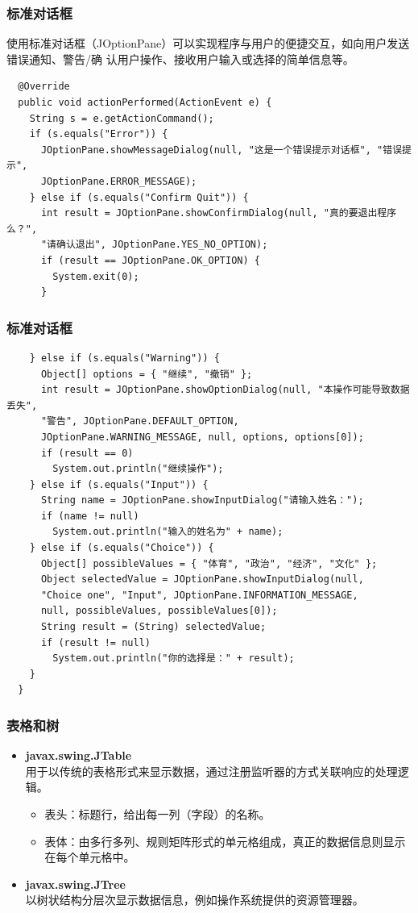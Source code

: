 \begin{frame}[fragile] %
\frametitle{标准对话框}

使用标准对话框（JOptionPane）可以实现程序与用户的便捷交互，如向用户发送错误通知、警告/确
认用户操作、接收用户输入或选择的简单信息等。

\scriptsize
\begin{verbatim}
  @Override
  public void actionPerformed(ActionEvent e) {
    String s = e.getActionCommand();
    if (s.equals("Error")) {
      JOptionPane.showMessageDialog(null, "这是一个错误提示对话框", "错误提示",
      JOptionPane.ERROR_MESSAGE);
    } else if (s.equals("Confirm Quit")) {
      int result = JOptionPane.showConfirmDialog(null, "真的要退出程序么？",
      "请确认退出", JOptionPane.YES_NO_OPTION);
      if (result == JOptionPane.OK_OPTION) {
        System.exit(0);
      }
\end{verbatim}
\end{frame}

\begin{frame}[fragile] %
\frametitle{标准对话框}

\scriptsize
\begin{verbatim}
    } else if (s.equals("Warning")) {
      Object[] options = { "继续", "撤销" };
      int result = JOptionPane.showOptionDialog(null, "本操作可能导致数据丢失",
      "警告", JOptionPane.DEFAULT_OPTION,
      JOptionPane.WARNING_MESSAGE, null, options, options[0]);
      if (result == 0)
        System.out.println("继续操作");
    } else if (s.equals("Input")) {
      String name = JOptionPane.showInputDialog("请输入姓名：");
      if (name != null) 
        System.out.println("输入的姓名为" + name);
    } else if (s.equals("Choice")) {
      Object[] possibleValues = { "体育", "政治", "经济", "文化" };
      Object selectedValue = JOptionPane.showInputDialog(null,
      "Choice one", "Input", JOptionPane.INFORMATION_MESSAGE,
      null, possibleValues, possibleValues[0]);
      String result = (String) selectedValue;
      if (result != null) 
        System.out.println("你的选择是：" + result);
    }
  }
\end{verbatim}
\end{frame}

\begin{frame}[fragile] %
\frametitle{表格和树}
\begin{itemize}
\item {\bf javax.swing.JTable}\\
用于以传统的表格形式来显示数据，通过注册监听器的方式关联响应的处理逻辑。
\begin{itemize}
\item 表头：标题行，给出每一列（字段）的名称。
\item 表体：由多行多列、规则矩阵形式的单元格组成，真正的数据信息则显示在每个单元格中。
\end{itemize}
\item {\bf javax.swing.JTree}\\
以树状结构分层次显示数据信息，例如操作系统提供的资源管理器。
\end{itemize}
\end{frame}

